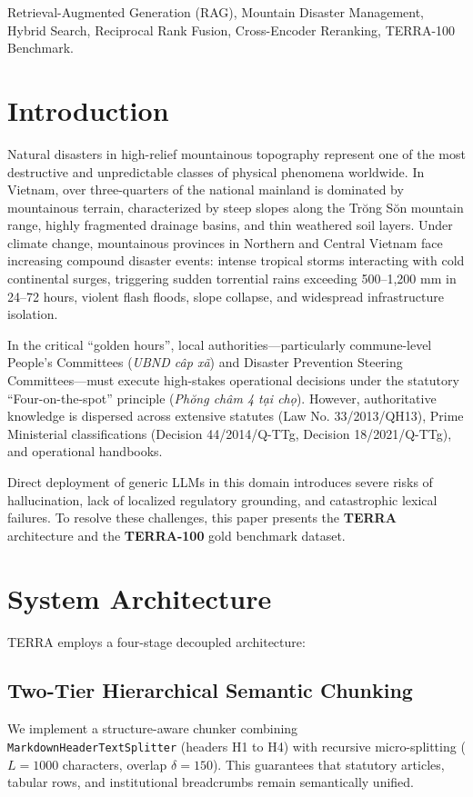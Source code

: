 \documentclass[conference]{IEEEtran}
\begin{document}
\begin{IEEEkeywords}
Retrieval-Augmented Generation (RAG), Mountain Disaster Management, Hybrid Search, Reciprocal Rank Fusion, Cross-Encoder Reranking, TERRA-100 Benchmark.
\end{IEEEkeywords}

\section{Introduction}
Natural disasters in high-relief mountainous topography represent one of the most destructive and unpredictable classes of physical phenomena worldwide. In Vietnam, over three-quarters of the national mainland is dominated by mountainous terrain, characterized by steep slopes along the Tr\u{o}ng S\u{o}n mountain range, highly fragmented drainage basins, and thin weathered soil layers. Under climate change, mountainous provinces in Northern and Central Vietnam face increasing compound disaster events: intense tropical storms interacting with cold continental surges, triggering sudden torrential rains exceeding 500--1,200 mm in 24--72 hours, violent flash floods, slope collapse, and widespread infrastructure isolation.

In the critical ``golden hours'', local authorities—particularly commune-level People's Committees (\textit{UBND c\^{a}p x\~{a}}) and Disaster Prevention Steering Committees—must execute high-stakes operational decisions under the statutory ``Four-on-the-spot'' principle (\textit{Ph\u{o}ng ch\^{a}m 4 t\d{a}i ch\d{o}}). However, authoritative knowledge is dispersed across extensive statutes (Law No. 33/2013/QH13), Prime Ministerial classifications (Decision 44/2014/Q\DJ-TTg, Decision 18/2021/Q\DJ-TTg), and operational handbooks. 

Direct deployment of generic LLMs in this domain introduces severe risks of hallucination, lack of localized regulatory grounding, and catastrophic lexical failures. To resolve these challenges, this paper presents the \textbf{TERRA} architecture and the \textbf{TERRA-100} gold benchmark dataset.

\section{System Architecture}
TERRA employs a four-stage decoupled architecture:

\subsection{Two-Tier Hierarchical Semantic Chunking}
We implement a structure-aware chunker combining \texttt{MarkdownHeaderTextSplitter} (headers H1 to H4) with recursive micro-splitting ($L = 1000$ characters, overlap $\delta = 150$). This guarantees that statutory articles, tabular rows, and institutional breadcrumbs remain semantically unified.
\end{document}
